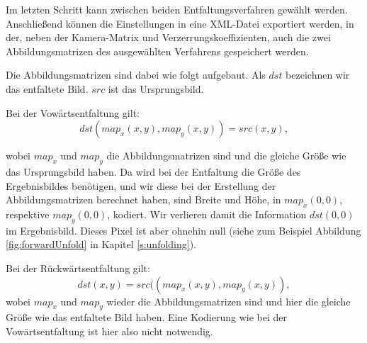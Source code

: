 Im letzten Schritt kann zwischen beiden Entfaltungsverfahren gewählt werden. Anschließend können die Einstellungen in eine XML-Datei exportiert werden, in der, neben der Kamera-Matrix und Verzerrungskoeffizienten, auch die zwei Abbildungsmatrizen des ausgewählten Verfahrens gespeichert werden. 


Die Abbildungsmatrizen sind dabei wie folgt aufgebaut. Als $dst$ bezeichnen wir das entfaltete Bild. $src$ ist das Ursprungsbild.

Bei der Vowärtsentfaltung gilt:
\[
dst(map_x(x,y), map_y(x,y)) = src(x,y),
\]

wobei $map_x$ und $map_y$ die Abbildungsmatrizen sind und die gleiche Größe wie das Ursprungsbild haben. Da wird bei der Entfaltung die Größe des Ergebnisbildes benötigen, und wir diese bei der Erstellung der Abbildungsmatrizen berechnet haben, sind Breite und Höhe, in $map_x(0,0)$, respektive $map_y(0,0)$, kodiert. Wir verlieren damit die Information $dst(0,0)$ im Ergebnisbild. Dieses Pixel ist aber ohnehin null (siehe zum Beispiel Abbildung \ref{fig:forwardUnfold} in Kapitel \ref{s:unfolding}). 

Bei der Rückwärtsentfaltung gilt:
\[
dst(x,y) = src((map_x(x,y),map_y(x,y)),
\]
wobei $map_x$ und $map_y$ wieder die Abbildungsmatrizen sind und hier die  gleiche Größe wie das entfaltete Bild haben. Eine Kodierung wie bei der Vowärtsentfaltung ist hier also nicht notwendig.
